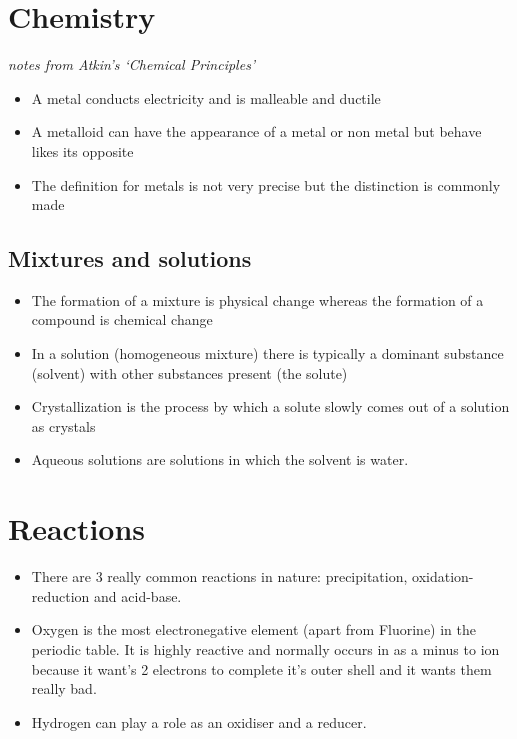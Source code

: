 \documentclass[12pt]{article}
\begin{document}
    
    \section{Chemistry}\label{chemistry}
    \emph{notes from Atkin's `Chemical Principles'}

    \begin{itemize}
        \item A metal conducts electricity and is malleable and ductile \item
          A metalloid can have the appearance of a metal or non metal but behave
          likes its opposite
        \item The definition for metals is not very precise but the distinction
            is commonly made 
    \end{itemize}

    \subsection{Mixtures and solutions}\label{mixtures-and-solutions}

        \begin{itemize}
        \item
          The formation of a mixture is physical change whereas the formation of
          a compound is chemical change
        \item
          In a solution (homogeneous mixture) there is typically a dominant
          substance (solvent) with other substances present (the solute)
        \item
          Crystallization is the process by which a solute slowly comes out of a
          solution as crystals
        \item
          Aqueous solutions are solutions in which the solvent is water.
        \end{itemize}

    \section{Reactions}\label{reactions}

        \begin{itemize}
        \item There are 3 really common reactions in nature: precipitation,
            oxidation-reduction and acid-base.
        \item Oxygen is the most electronegative element (apart from Fluorine)
            in the periodic table. It is highly reactive and normally occurs in
            as a minus to ion because it want's 2 electrons to complete it's
            outer shell and it wants them really bad.
        \item Hydrogen can play a role as an oxidiser and a reducer.
    \end{itemize}
\end{document}
